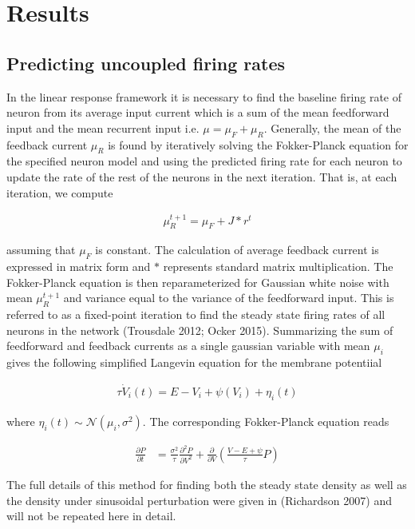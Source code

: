 \documentclass{ucetd}
\begin{document}
\section{Results}

\subsection{Predicting uncoupled firing rates}

In the linear response framework it is necessary to find the baseline firing rate of neuron from its average input current which is a sum of the mean feedforward input and the mean recurrent input i.e. $\mu = \mu_{F} + \mu_{R}$. Generally, the mean of the feedback current $\mu_{R}$ is found by iteratively solving the Fokker-Planck equation for the specified neuron model and using the predicted firing rate for each neuron to update the rate of the rest of the neurons in the next iteration. That is, at each iteration, we compute

\begin{align*}
\mu_{R}^{t+1} = \mu_{F} + J * r^{t}
\end{align*}

assuming that $\mu_{F}$ is constant. The calculation of average feedback current is expressed in matrix form and $*$ represents standard matrix multiplication. The Fokker-Planck equation is then reparameterized for Gaussian white noise with mean $\mu_{R}^{t+1}$ and variance equal to the variance of the feedforward input. This is referred to as a fixed-point iteration to find the steady state firing rates of all neurons in the network (Trousdale 2012; Ocker 2015). Summarizing the sum of feedforward and feedback currents as a single gaussian variable with mean $\mu_{i}$ gives the following simplified Langevin equation for the membrane potentiial

\begin{align}
\tau\dot{V}_{i}(t) = E - V_{i} + \psi(V_{i}) + \eta_{i}(t)
\end{align}

where $\eta_{i}(t) \sim \mathcal{N}(\mu_{i},\sigma^{2})$. The corresponding Fokker-Planck equation reads

\begin{align}
\frac{\partial P}{\partial t} &= \frac{\sigma^{2}}{\tau}\frac{\partial^{2}P}{\partial V^{2}} + \frac{\partial}{\partial V}\left(\frac{V-E+\psi}{\tau}P\right)
\end{align}

The full details of this method for finding both the steady state density as well as the density under sinusoidal perturbation were given in (Richardson 2007) and will not be repeated here in detail.
\end{document}
